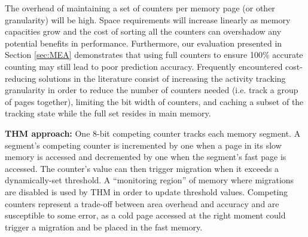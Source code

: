 
The overhead of maintaining a set of counters per memory page (or other granularity) will be high. Space requirements will increase linearly as memory capacities grow and the cost of sorting all the counters can overshadow any potential benefits in performance. Furthermore, our evaluation presented in Section \ref{sec:MEA} demonstrates that using full counters to ensure 100\% accurate counting may still lead to poor prediction accuracy. Frequently encountered cost-reducing solutions in the literature consist of increasing the activity tracking granularity in order to reduce the number of counters needed (i.e. track a group of pages together), limiting the bit width of counters, and caching a subset of the tracking state while the full set resides in main memory. 




	\textbf{THM approach:} One 8-bit competing counter tracks each memory segment. A segment's competing counter is incremented by one when a page in its slow memory is accessed and decremented by one when the segment's fast page is accessed. The counter's value can then trigger migration when it exceeds a dynamically-set threshold. A ``monitoring region'' of memory where migrations are disabled is used by THM in order to update threshold values. Competing counters represent a trade-off between area overhead and accuracy and are susceptible to some error, as a cold page accessed at the right moment could trigger a migration and be placed in the fast memory.

